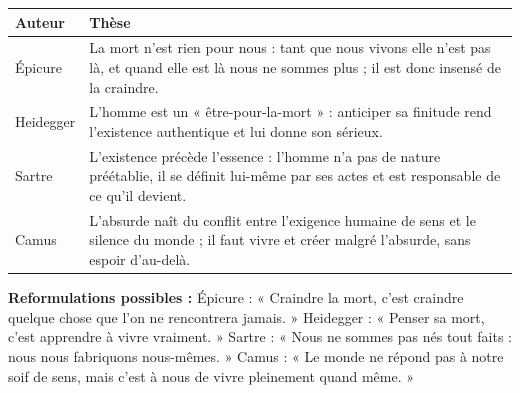 \documentclass[11pt]{article}
\begin{document}
\begin{corrige}
\begin{center}
\begin{tabularx}{\linewidth}{|l|X|}
\hline
\rowcolor{popblueL} \textbf{Auteur} & \textbf{Thèse} \\
\hline
Épicure & La mort n'est rien pour nous : tant que nous vivons elle n'est pas là, et quand elle est là nous ne sommes plus ; il est donc insensé de la craindre. \\
\hline
Heidegger & L'homme est un « être-pour-la-mort » : anticiper sa finitude rend l'existence authentique et lui donne son sérieux. \\
\hline
Sartre & L'existence précède l'essence : l'homme n'a pas de nature préétablie, il se définit lui-même par ses actes et est responsable de ce qu'il devient. \\
\hline
Camus & L'absurde naît du conflit entre l'exigence humaine de sens et le silence du monde ; il faut vivre et créer malgré l'absurde, sans espoir d'au-delà. \\
\hline
\end{tabularx}
\end{center}
\textbf{Reformulations possibles :} Épicure : « Craindre la mort, c'est craindre quelque chose que l'on ne rencontrera jamais. » Heidegger : « Penser sa mort, c'est apprendre à vivre vraiment. » Sartre : « Nous ne sommes pas nés tout faits : nous nous fabriquons nous-mêmes. » Camus : « Le monde ne répond pas à notre soif de sens, mais c'est à nous de vivre pleinement quand même. »
\end{corrige}
\end{document}

